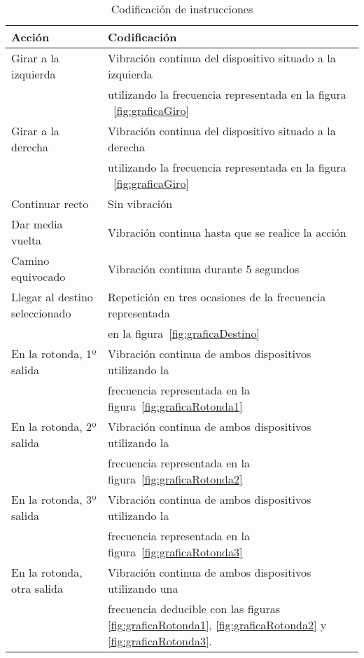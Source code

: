 \begin{table}[h]
  \centering
  \begin{tabular}{|l|l|}
    \hline
    \textbf{Acción} & \textbf{Codificación} \\
    \hline
    Girar a la izquierda & Vibración continua del dispositivo situado a la izquierda \\
                         & utilizando la frecuencia representada en la figura
                           ~\ref{fig:graficaGiro} \\
    \hline
    Girar a la derecha & Vibración continua del dispositivo situado a la derecha \\
                       & utilizando la frecuencia representada en la figura
                           ~\ref{fig:graficaGiro} \\
    \hline
    Continuar recto & Sin vibración \\
    \hline
    Dar media vuelta & Vibración continua hasta que se realice la acción \\
    \hline
    Camino equivocado & Vibración continua durante 5 segundos \\
    \hline
    Llegar al destino seleccionado & Repetición en tres ocasiones de la frecuencia representada \\
                                   & en la figura~\ref{fig:graficaDestino} \\
    \hline
    En la rotonda, 1º salida & Vibración continua de ambos dispositivos utilizando la \\
                             & frecuencia representada en la figura~\ref{fig:graficaRotonda1} \\
    \hline
    En la rotonda, 2º salida & Vibración continua de ambos dispositivos utilizando la \\
                             & frecuencia representada en la figura~\ref{fig:graficaRotonda2} \\
    \hline
    En la rotonda, 3º salida & Vibración continua de ambos dispositivos utilizando la \\
                             & frecuencia representada en la figura~\ref{fig:graficaRotonda3} \\
    \hline
    En la rotonda, otra salida & Vibración continua de ambos dispositivos utilizando una \\
                               & frecuencia deducible con las figuras \ref{fig:graficaRotonda1}, 
                                   \ref{fig:graficaRotonda2} y \ref{fig:graficaRotonda3}. \\
    \hline
  \end{tabular}
  \caption{Codificación de instrucciones}
  \label{cuadro:vibraciones}
\end{table} 

